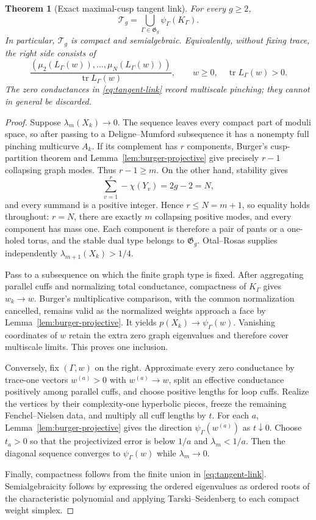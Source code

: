 \documentclass[11pt,reqno]{amsart}
\newtheorem{theorem}{Theorem}[section]
\theoremstyle{definition}
\theoremstyle{remark}
\newcommand{\tr}{\operatorname{tr}}
\begin{document}
\begin{theorem}[Exact maximal-cusp tangent link]
\label{thm:tangent-link}
For every $g\ge2$,
\begin{equation}\label{eq:tangent-link}
 \boxed{\quad
 \mathcal T_g=\bigcup_{\Gamma\in\mathfrak G_g}
                    \psi_\Gamma(K_\Gamma).
 \quad}
\end{equation}
In particular, $\mathcal T_g$ is compact and semialgebraic.  Equivalently,
without fixing trace, the right side consists of
\[
 \frac{(\mu_2(L_\Gamma(w)),\ldots,\mu_N(L_\Gamma(w)))}
      {\tr L_\Gamma(w)},
 \qquad w\ge0,\quad \tr L_\Gamma(w)>0.
\]
The zero conductances in \eqref{eq:tangent-link} record multiscale pinching;
they cannot in general be discarded.
\end{theorem}

\begin{proof}
Suppose $\lambda_m(X_k)\to0$.  The sequence leaves every compact part of
moduli space, so after passing to a Deligne--Mumford subsequence it has a
nonempty full pinching multicurve $A_k$.  If its
complement has $r$ components, Burger's cusp-partition theorem and
Lemma~\ref{lem:burger-projective} give precisely $r-1$ collapsing graph
modes.  Thus $r-1\ge m$.  On the other hand, stability gives
\[
 \sum_{v=1}^r-\chi(Y_v)=2g-2=N,
\]
and every summand is a positive integer.  Hence $r\le N=m+1$, so equality
holds throughout: $r=N$, there are exactly $m$ collapsing positive modes,
and every component has mass one.  Each component is therefore a pair of
pants or a one-holed torus, and the stable dual type belongs to
$\mathfrak G_g$.  Otal--Rosas supplies independently
$\lambda_{m+1}(X_k)>1/4$.

Pass to a subsequence on which the finite graph type is fixed.  After
aggregating parallel cuffs and normalizing total conductance, compactness of
$K_\Gamma$ gives $w_k\to w$.  Burger's multiplicative comparison, with the
common normalization cancelled, remains valid as the normalized weights
approach a face by Lemma~\ref{lem:burger-projective}.  It yields
$p(X_k)\to\psi_\Gamma(w)$.  Vanishing coordinates of $w$ retain the extra
zero graph eigenvalues and therefore cover multiscale limits.  This proves
one inclusion.

Conversely, fix $(\Gamma,w)$ on the right.  Approximate every zero
conductance by trace-one vectors $w^{(a)}>0$ with $w^{(a)}\to w$, split an
effective conductance
positively among parallel cuffs, and choose positive lengths for loop cuffs.
Realize the vertices by their complexity-one hyperbolic pieces, freeze the
remaining Fenchel--Nielsen data, and multiply all cuff lengths by $t$.
For each $a$, Lemma~\ref{lem:burger-projective} gives the direction
$\psi_\Gamma(w^{(a)})$ as $t\downarrow0$.  Choose $t_a>0$ so that the
projectivized error is below $1/a$ and $\lambda_m<1/a$.  Then the diagonal
sequence converges to $\psi_\Gamma(w)$ while $\lambda_m\to0$.

Finally, compactness follows from the finite union in
\eqref{eq:tangent-link}.  Semialgebraicity follows by expressing the ordered
eigenvalues as ordered roots of the characteristic polynomial and applying
Tarski--Seidenberg to each compact weight simplex.
\end{proof}
\end{document}
